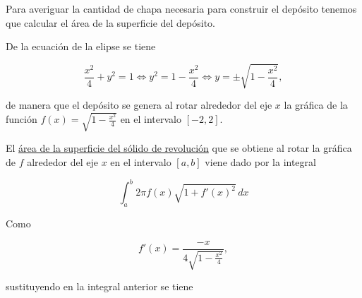 \documentclass[
  spanish,
  a4paper,
]{scrreport}
\theoremstyle{definition}
\theoremstyle{remark}
\begin{document}
\begin{tcolorbox}[enhanced jigsaw, arc=.35mm, bottomrule=.15mm, bottomtitle=1mm, breakable, colback=white, colbacktitle=quarto-callout-tip-color!10!white, colframe=quarto-callout-tip-color-frame, coltitle=black, left=2mm, leftrule=.75mm, opacityback=0, opacitybacktitle=0.6, rightrule=.15mm, title=\textcolor{quarto-callout-tip-color}{\faLightbulb}\hspace{0.5em}{Solución}, titlerule=0mm, toprule=.15mm, toptitle=1mm]

Para averiguar la cantidad de chapa necesaria para construir el depósito
tenemos que calcular el área de la superficie del depósito.

De la ecuación de la elipse se tiene

\[
\frac{x^2}{4}+y^2=1 \Leftrightarrow y^2 = 1-\frac{x^2}{4} \Leftrightarrow y = \pm \sqrt{1-\frac{x^2}{4}},
\]

de manera que el depósito se genera al rotar alrededor del eje \(x\) la
gráfica de la función \(f(x) = \sqrt{1-\frac{x^2}{4}}\) en el intervalo
\([-2,2]\).

El
\href{https://aprendeconalf.es/analisis-manual/08-integrales.html\#c\%C3\%A1lculo-de-superficies-de-s\%C3\%B3lidos-de-revoluci\%C3\%B3n}{área
de la superficie del sólido de revolución} que se obtiene al rotar la
gráfica de \(f\) alrededor del eje \(x\) en el intervalo \([a,b]\) viene
dado por la integral

\[
\int_a^b 2\pi f(x) \sqrt{1+f'(x)^2}\,dx
\]

Como

\[
f'(x) = \frac{-x}{4\sqrt{1-\frac{x^2}{4}}},
\]

sustituyendo en la integral anterior se tiene


\end{tcolorbox}
\end{document}
